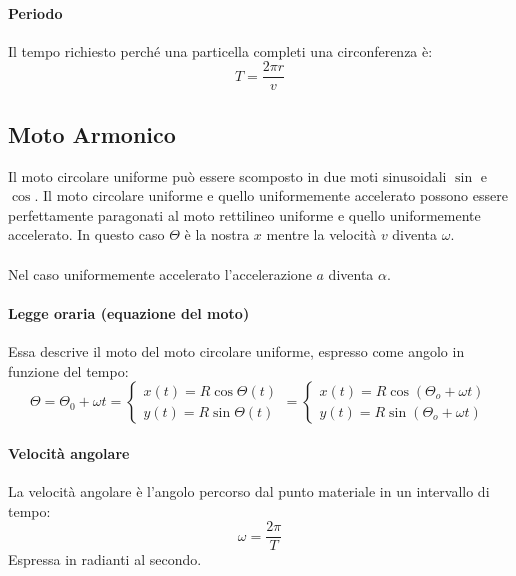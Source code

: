         \paragraph{Periodo} Il tempo richiesto perché una particella completi
        una circonferenza è:
        \begin{equation}
            T = \frac{2\pi r}{v}
        \end{equation}

    
        \subsection{Moto Armonico}  \label{moto_armonico}
        Il moto circolare uniforme può essere scomposto in due moti sinusoidali 
        $\sin$ e $\cos$.
        Il moto circolare uniforme e quello uniformemente accelerato possono 
        essere perfettamente paragonati al moto rettilineo uniforme e quello 
        uniformemente accelerato. In questo caso $\Theta$ è la nostra $x$ 
        mentre la velocità $v$ diventa $\omega$.\\\\
        Nel caso uniformemente accelerato l'accelerazione $a$ diventa $\alpha$.

        \paragraph{Legge oraria (equazione del moto)} Essa descrive il moto del
        moto circolare uniforme, espresso come angolo in funzione del tempo:
        \begin{equation}
            \Theta = \Theta_0 + \omega t = 
            \begin{cases}
                x(t)=R\cos{\Theta(t)} \\
                y(t)=R\sin{\Theta(t)}
            \end{cases} 
            = 
            \begin{cases}
                x(t)=R\cos{(\Theta_o+\omega t)} \\
                y(t)=R\sin{(\Theta_o+\omega t)}
            \end{cases}
        \end{equation}

        \paragraph{Velocità angolare} La velocità angolare è l'angolo percorso
        dal punto materiale in un intervallo di tempo:
        \begin{equation}
            \omega = \frac{2\pi}{T}
        \end{equation}
        Espressa in radianti al secondo.

